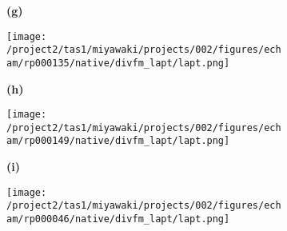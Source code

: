 \documentclass[preview]{standalone}
\begin{document}
\begin{figure}
  \begin{subfigure}[t]{0.05\textwidth}
    \textbf{\normalsize{(g)}}
  \end{subfigure}
  \begin{subfigure}[t]{0.45\textwidth}
    \texttt{[image: /project2/tas1/miyawaki/projects/002/figures/echam/rp000135/native/divfm\_lapt/lapt.png]}
  \end{subfigure}
  \begin{subfigure}[t]{0.05\textwidth}
    \textbf{\normalsize{(h)}}
  \end{subfigure}
  \begin{subfigure}[t]{0.45\textwidth}
    \texttt{[image: /project2/tas1/miyawaki/projects/002/figures/echam/rp000149/native/divfm\_lapt/lapt.png]}
  \end{subfigure}
  
  \begin{subfigure}[t]{0.05\textwidth}
    \textbf{\normalsize{(i)}}
  \end{subfigure}
  \begin{subfigure}[t]{0.45\textwidth}
    \texttt{[image: /project2/tas1/miyawaki/projects/002/figures/echam/rp000046/native/divfm\_lapt/lapt.png]}
  \end{subfigure}
\end{figure}
\end{document}
